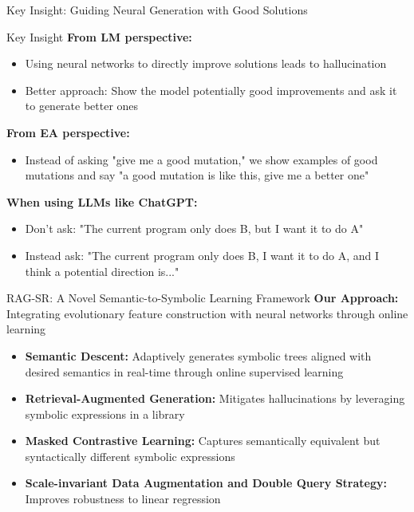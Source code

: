 \documentclass[aspectratio=1610]{beamer}
\begin{document}
    \begin{frame}{Key Insight: Guiding Neural Generation with Good Solutions}
        \begin{alertblock}{Key Insight}
            \textbf{From LM perspective:}
            \begin{itemize}
                \item Using neural networks to directly improve solutions leads to hallucination
                \item Better approach: Show the model potentially good improvements and ask it to generate better ones
            \end{itemize}

            \textbf{From EA perspective:}
            \begin{itemize}
                \item Instead of asking "give me a good mutation," we show examples of good mutations and say "a good mutation is like this, give me a better one"
            \end{itemize}

            \textbf{When using LLMs like ChatGPT:}
            \begin{itemize}
                \item Don't ask: "The current program only does B, but I want it to do A"
                \item Instead ask: "The current program only does B, I want it to do A, and I think a potential direction is..."
            \end{itemize}
        \end{alertblock}
    \end{frame}


    \begin{frame}{RAG-SR: A Novel Semantic-to-Symbolic Learning Framework}
        \textbf{Our Approach:} Integrating evolutionary feature construction with neural networks through online learning

        \begin{itemize}
            \item \textbf{Semantic Descent:} Adaptively generates symbolic trees aligned with desired semantics in real-time through online supervised learning

            \item \textbf{Retrieval-Augmented Generation:} Mitigates hallucinations by leveraging symbolic expressions in a library

            \item \textbf{Masked Contrastive Learning:} Captures semantically equivalent but syntactically different symbolic expressions

            \item \textbf{Scale-invariant Data Augmentation and Double Query Strategy:} Improves robustness to linear regression
        \end{itemize}
    \end{frame}
\end{document}
